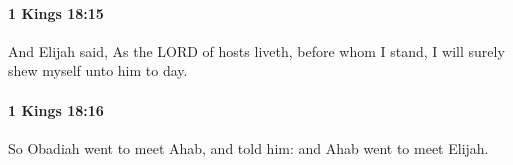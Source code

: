 		\paragraph{1 Kings 18:15} %
			\label{1KINGS-18-15}

			And Elijah said, As the LORD of hosts liveth, before whom I stand, I will surely shew myself unto him to day.


		\paragraph{1 Kings 18:16} %
			\label{1KINGS-18-16}

			So Obadiah went to meet Ahab, and told him: and Ahab went to meet Elijah.


